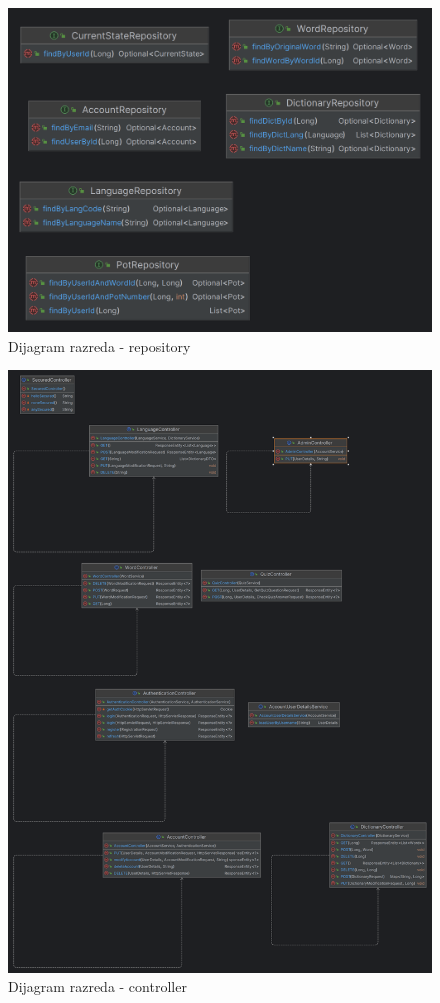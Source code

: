 			\begin{figure}[H]
				\includegraphics[width=\textwidth]{slike/ClassDiagram3.PNG}
				\caption{Dijagram razreda - repository}
				\label{fig:classDiagram3}
			\end{figure}
			
			\begin{figure}[H]
				\includegraphics[width=\textwidth]{slike/ClassDiagram4.PNG}
				\caption{Dijagram razreda - controller}
				\label{fig:classDiagram4}
			\end{figure}
			
